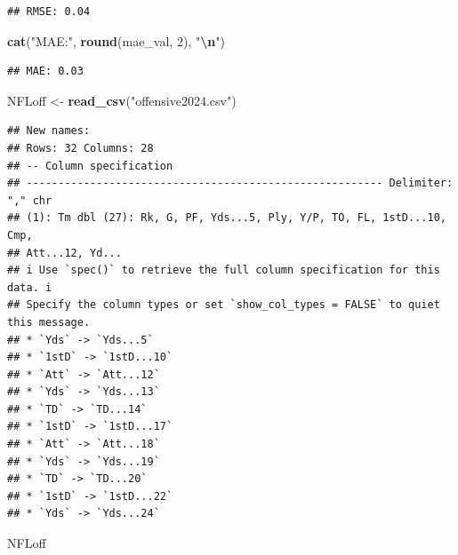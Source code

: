 \documentclass[
]{article}
\newenvironment{Shaded}{\begin{snugshade}}{\end{snugshade}}
\newcommand{\DecValTok}[1]{\textcolor[rgb]{0.00,0.00,0.81}{#1}}
\newcommand{\FunctionTok}[1]{\textcolor[rgb]{0.13,0.29,0.53}{\textbf{#1}}}
\newcommand{\NormalTok}[1]{#1}
\newcommand{\OtherTok}[1]{\textcolor[rgb]{0.56,0.35,0.01}{#1}}
\newcommand{\SpecialCharTok}[1]{\textcolor[rgb]{0.81,0.36,0.00}{\textbf{#1}}}
\newcommand{\StringTok}[1]{\textcolor[rgb]{0.31,0.60,0.02}{#1}}
\begin{document}
\begin{verbatim}
## RMSE: 0.04
\end{verbatim}

\begin{Shaded}
\begin{Highlighting}[]
\FunctionTok{cat}\NormalTok{(}\StringTok{"MAE:"}\NormalTok{, }\FunctionTok{round}\NormalTok{(mae\_val, }\DecValTok{2}\NormalTok{), }\StringTok{"}\SpecialCharTok{\textbackslash{}n}\StringTok{"}\NormalTok{)}
\end{Highlighting}
\end{Shaded}

\begin{verbatim}
## MAE: 0.03
\end{verbatim}

\begin{Shaded}
\begin{Highlighting}[]
\NormalTok{NFLoff }\OtherTok{\textless{}{-}} \FunctionTok{read\_csv}\NormalTok{(}\StringTok{"offensive2024.csv"}\NormalTok{)}
\end{Highlighting}
\end{Shaded}

\begin{verbatim}
## New names:
## Rows: 32 Columns: 28
## -- Column specification
## -------------------------------------------------------- Delimiter: "," chr
## (1): Tm dbl (27): Rk, G, PF, Yds...5, Ply, Y/P, TO, FL, 1stD...10, Cmp,
## Att...12, Yd...
## i Use `spec()` to retrieve the full column specification for this data. i
## Specify the column types or set `show_col_types = FALSE` to quiet this message.
## * `Yds` -> `Yds...5`
## * `1stD` -> `1stD...10`
## * `Att` -> `Att...12`
## * `Yds` -> `Yds...13`
## * `TD` -> `TD...14`
## * `1stD` -> `1stD...17`
## * `Att` -> `Att...18`
## * `Yds` -> `Yds...19`
## * `TD` -> `TD...20`
## * `1stD` -> `1stD...22`
## * `Yds` -> `Yds...24`
\end{verbatim}

\begin{Shaded}
\begin{Highlighting}[]
\NormalTok{NFLoff}
\end{Highlighting}
\end{Shaded}
\end{document}

